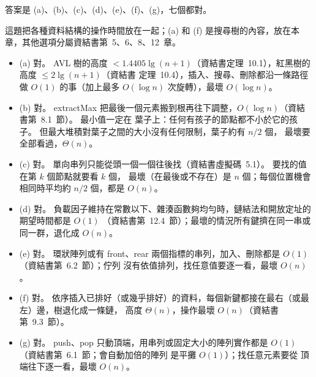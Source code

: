 \begin{pastsoln}
答案是 (a)、(b)、(c)、(d)、(e)、(f)、(g)，七個都對。

這題把各種資料結構的操作時間放在一起；(a) 和 (f) 是搜尋樹的內容，放在本章，其他選項分屬資結書第~5、6、8、12~章。
\begin{itemize}
\item (a) 對。 AVL 樹的高度 $< 1.4405\lg(n+1)$（資結書定理~10.1），紅黑樹的高度 $\le 2\lg(n+1)$（資結書
定理~10.4），插入、搜尋、刪除都沿一條路徑做 $O(1)$ 的事（加上最多 $O(\log n)$ 次旋轉），最壞 $O(\log n)$。
\item (b) 對。 extractMax 把最後一個元素搬到根再往下調整，$O(\log n)$（資結書第~8.1~節）。 最小值一定在
葉子上：任何有孩子的節點都不小於它的孩子。 但最大堆積對葉子之間的大小沒有任何限制，葉子約有 $n/2$ 個，
最壞要全部看過，$\Theta(n)$。
\item (c) 對。 單向串列只能從頭一個一個往後找（資結書虛擬碼~5.1）。 要找的值在第 $k$ 個節點就要看 $k$ 個，
最壞（在最後或不存在）是 $n$ 個；每個位置機會相同時平均約 $n/2$ 個，都是 $O(n)$。
\item (d) 對。 負載因子維持在常數以下、雜湊函數夠均勻時，鏈結法和開放定址的期望時間都是 $O(1)$
（資結書第~12.4~節）；最壞的情況所有鍵擠在同一串或同一群，退化成 $O(n)$。
\item (e) 對。 環狀陣列或有 front、rear 兩個指標的串列，加入、刪除都是 $O(1)$（資結書第~6.2~節）；佇列
沒有依值排列，找任意值要逐一看，最壞 $O(n)$。
\item (f) 對。 依序插入已排好（或幾乎排好）的資料，每個新鍵都接在最右（或最左）邊，樹退化成一條鏈，
高度 $\Theta(n)$，操作最壞 $O(n)$（資結書第~9.3~節）。
\item (g) 對。 push、pop 只動頂端，用串列或固定大小的陣列實作都是 $O(1)$（資結書第~6.1~節；會自動加倍的陣列
是平攤 $O(1)$）；找任意元素要從
頂端往下逐一看，最壞 $O(n)$。
\end{itemize}
\end{pastsoln}
